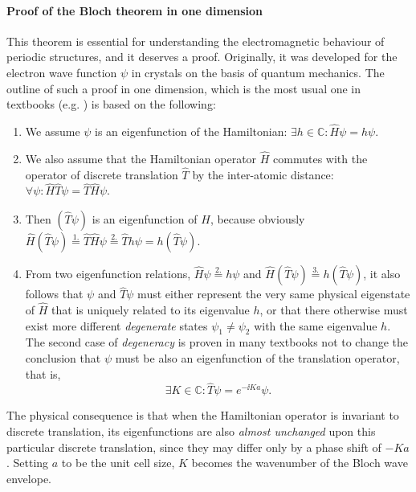 \paragraph{Proof of the Bloch theorem in one dimension}%
This theorem is essential for understanding the electromagnetic behaviour of periodic structures, and it deserves a proof. Originally, it was developed for the electron wave function $\psi$ in crystals on the basis of quantum mechanics. The outline of such a proof in one dimension, which is the most usual one in textbooks (e.g. \cite[p. 134]{ashcroft2005solid}) is based on the following:
\label{blochproof}
\begin{enumerate}
 \item{We assume $\psi$ is an eigenfunction of the Hamiltonian: $\exists h\in \mathbb{C}: \hat H\psi = h\psi$.} 
 \item{We also assume that the Hamiltonian operator $\hat H$ commutes with the operator of discrete translation $\hat T$ by the inter-atomic distance: $\forall \psi: \hat H\hat T\psi = \hat T\hat H\psi$. } 
 \item{Then $(\hat T\psi)$ is an eigenfunction of $H$, because obviously $\hat H(\hat T\psi) \stackrel{1.}{=} \hat T\hat H\psi \stackrel{2.}{=} \hat Th\psi = h(\hat T\psi)$. }
 \item{From two eigenfunction relations, $\hat H\psi\stackrel{2.}{=} h\psi$ and $\hat H(\hat T\psi) \stackrel{3.}{=} h(\hat T\psi)$, it also follows that $\psi$ and $\hat T\psi$ must either represent the very same physical eigenstate of $\hat H$ that is uniquely related to its eigenvalue $h$, or that there otherwise must exist more different \textit{degenerate} states $\psi_1\neq \psi_2$ with the same eigenvalue $h$. The second case of \textit{degeneracy} is proven in many textbooks not to change the conclusion that $\psi$ must be also an eigenfunction of the translation operator, that is,
$$\exists K\in \mathbb{C}: \hat T\psi = e^{-\ii Ka}\psi.$$ 
}
\end{enumerate}
 The physical consequence is that when the Hamiltonian operator is invariant to discrete translation, its eigenfunctions are also \textit{almost unchanged} upon this particular discrete translation, since they may differ only by a phase shift of $-Ka$. Setting $a$ to be the unit cell size, $K$ becomes the wavenumber of the Bloch wave envelope.
%

